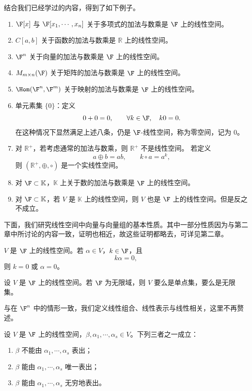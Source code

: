 结合我们已经学过的内容，得到了如下例子。
\begin{example}
	\begin{enumerate}
		\item $\F[x]$ 与 $\F[x_1,\cdots,x_n]$ 关于多项式的加法与数乘是 $\F$ 上的线性空间。
		\item $C[a,b]$ 关于函数的加法与数乘是 $\mathbb{R}$ 上的线性空间。
		\item $\F^n$ 关于向量的加法与数乘是 $\F$ 上的线性空间。
		\item $M_{m\times n}(\F)$ 关于矩阵的加法与数乘是 $\F$ 上的线性空间。
		\item $\Hom(\F^n,\F^m)$ 关于映射的加法与数乘是 $\F$ 上的线性空间。
		\item 单元素集 $\{0\}$：定义
		\[
		0+0=0,
		\qquad
		\forall k\in\F,\quad k0=0.
		\]
		\label{p1:concept:c4-l75}在这种情况下显然满足上述八条，仍是 $\F$-线性空间，称为零空间，记为 $0$。
		\item 对 $\mathbb{R}^{+}$，若考虑通常的加法与数乘，则 $\mathbb{R}^{+}$ 不是线性空间。
		若定义
		\[
		a\oplus b=ab,
		\qquad
		k\circ a=a^k,
		\]
		则 $(\mathbb{R}^{+},\oplus,\circ)$ 是一个实线性空间。
		\item 对 $\F\subset \mathbb{K}$，$\mathbb{K}$ 上关于数的加法与数乘是 $\F$ 上的线性空间。
		\item 对 $\F\subset \mathbb{K}$，若 $V$ 是 $\mathbb{K}$ 上的线性空间，则 $V$ 也是 $\F$ 上的线性空间。但是反之不成立。
	\end{enumerate}
\end{example}


下面，我们研究线性空间中向量与向量组的基本性质。其中一部分性质因为与第二章中所讨论的内容一致，证明也相近，故这些证明都略去，可详见第二章。

\begin{lemma}[数乘消去律]
	$V$ 是 $\F$ 上的线性空间。若 $\alpha\in V$，$k\in\F$，且
	\[
	k\alpha=0,
	\]
	则 $k=0$ 或 $\alpha=0$。
\end{lemma}
\begin{corollary}
	设 $V$ 是 $\F$ 上的线性空间。若 $\F$ 为无限域，则 $V$ 要么是单点集，要么是无限集。
\end{corollary}


\label{p1:concept:c4-l104}与在 $\F^n$ 中的情形一致，我们定义线性组合、线性表示与线性相关，这里不再赘述。

\begin{proposition}
	设 $V$ 是 $\F$ 上的线性空间，$\beta,\alpha_1,\cdots,\alpha_s\in V$。下列三者之一成立：
	\begin{enumerate}
		\item $\beta$ 不能由 $\alpha_1,\cdots,\alpha_s$ 表出；
		\item $\beta$ 能由 $\alpha_1,\cdots,\alpha_s$ 唯一表出；
		\item $\beta$ 能由 $\alpha_1,\cdots,\alpha_s$ 无穷地表出。
	\end{enumerate}
\end{proposition}

